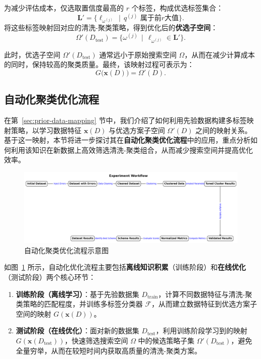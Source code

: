 \documentclass[10pt]{article} %
\numberwithin{equation}{section}
\begin{document}
为减少评估成本，仅选取置信度最高的 $r$ 个标签，构成优选标签集合：
\begin{equation}\label{eq:predicted-label-space}
\mathbf{L}' = \bigl\{\ell_{\omega^{(j)}} \,\mid\, q^{(j)} \text{ 属于前}r\text{大值}\bigr\}.
\end{equation}
将这些标签映射回对应的清洗-聚类策略，得到优化后的\textbf{优选子空间}：
\begin{equation}\label{eq:optimized-space}
\Omega'(D_{\text{test}})
= \bigl\{\omega^{(j)} \,\mid\, \ell_{\omega^{(j)}} \in \mathbf{L}'\bigr\}.
\end{equation}

此时，优选子空间 $\Omega'(D_{\text{test}})$ 通常远小于原始搜索空间 $\Omega$，从而在减少计算成本的同时，保持较高的聚类质量。最终，该映射过程可表示为：
\begin{equation}\label{eq:mapping-function}
G\bigl(\mathbf{x}(D)\bigr) = \Omega'(D).
\end{equation}

\subsection{自动化聚类优化流程}
\label{sec:autocluster-process}

在第~\ref{sec:prior-data-mapping} 节中，我们介绍了如何利用先验数据构建多标签映射策略，以学习数据特征 $\mathbf{x}(D)$ 与优选方案子空间 $\Omega'(D)$ 之间的映射关系。基于这一映射，本节将进一步探讨其在\textbf{自动化聚类优化流程}中的应用，重点分析如何利用该知识在新数据上高效筛选清洗-聚类组合，从而减少搜索空间并提高优化效率。

\begin{figure}[htbp]
  \centering
  \includegraphics[width=0.8\linewidth]{autocluster_workflow.png}
  \caption{自动化聚类优化流程示意图}
  \label{fig:autocluster-workflow}
\end{figure}

如图~\ref{fig:autocluster-workflow} 所示，自动化优化流程主要包括\textbf{离线知识积累}（训练阶段）和\textbf{在线优化}（测试阶段）两个核心环节： \begin{enumerate} \item \textbf{训练阶段（离线学习）}：基于先验数据集 $D_{\text{train}}$，计算不同数据特征与清洗-聚类策略的匹配程度，并训练多标签分类器 $\mathcal{F}$，从而建立数据特征到优选方案子空间的映射 $G(\mathbf{x}(D))$。 \item \textbf{测试阶段（在线优化）}：面对新的数据集 $D_{\text{test}}$，利用训练阶段学习到的映射 $G(\mathbf{x}(D_{\text{test}}))$，快速筛选搜索空间 $\Omega$ 中的候选策略子集 $\Omega'(D_{\text{test}})$，避免全量穷举，从而在较短时间内获取高质量的清洗-聚类方案。 \end{enumerate}
\end{document}
